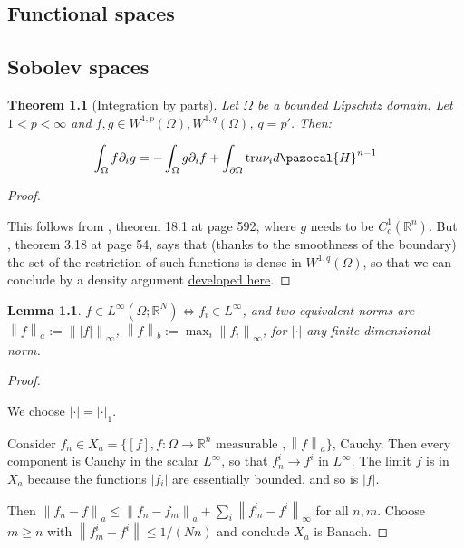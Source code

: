 \documentclass[english,a4paper,9pt,oneside]{scrbook}	%
\theoremstyle{break}
\newtheorem{thm}[equation]{Theorem}
\newtheorem{lemma}[equation]{Lemma}
\newenvironment{mproof}[1][\proofname]{%
  \begin{proof}[#1]$ $\par\nobreak\ignorespaces
}{%
  \end{proof}
}
\renewcommand*{\proofname}{Proof}
\theoremstyle{remark}
\newcommand{\mR}{\mathbb{R}}
\newcommand{\norm}[1]{\left\lVert#1\right\rVert}
\newcommand{\tr}{\text{tr}}
\begin{document}
\begin{appendices}

\appendix
\chapter{Functional spaces}
\section{Sobolev spaces}

\begin{thm}[Integration by parts]
\label{thm:ibp}
Let $\Omega$ be a bounded Lipschitz domain. Let $1<p<\infty$ and $f,g \in W^{1,p}(\Omega), W^{1,q}(\Omega)$, $q=p'$. Then:

$$\int_\Omega f \partial_i g = -\int_\Omega g \partial_i f+\int_{\partial \Omega} \tr u \nu_i d\pazocal{H}^{n-1}$$
\end{thm}
\begin{mproof}

This follows from \cite{leoni}, theorem 18.1 at page 592, where $g$ needs to be $C^1_c(\mR^n)$. But \cite{adams}, theorem 3.18 at page 54, says that (thanks to the smoothness of the boundary) the set of the restriction of such functions is dense in $W^{1,q}(\Omega)$, so that we can conclude by a density argument \textcolor{red}{\href{https://www.math.kit.edu/iana2/lehre/sobolevspaces2021s/media/lec15.pdf}{developed here}}.

\end{mproof}

\begin{lemma}
$f \in L^\infty(\Omega; \mR^N) \iff f_i \in L^\infty$, and two equivalent norms are $\norm{f}_a:=\norm{|f|}_\infty$, $\norm{f}_b:=\max_i\norm{f_i}_\infty$, for $|\cdot |$ any finite dimensional norm.
\end{lemma}
\begin{mproof}

We choose $|\cdot |=|\cdot|_1$.

Consider $f_n \in X_a = \{[f], f: \Omega \rightarrow \mR^n \text{ measurable }, \norm{f}_a\}$, Cauchy. Then every component is Cauchy in the scalar $L^\infty$, so that $f_n^i \rightarrow f^i $ in $L^\infty$. The limit $f$ is in $X_a$ because the functions $|f_i|$ are essentially bounded, and so is $|f|$. 

Then $\norm{f_n-f}_a\leq \norm{f_n-f_m}_a+\sum_i\norm{f_m^i-f^i}_\infty$ for all $n,m$. Choose $m\geq n$ with $\norm{f_m^i-f^i}\leq 1/(Nn)$ and conclude $X_a$ is Banach.


\end{mproof}
\end{appendices}
\end{document}
